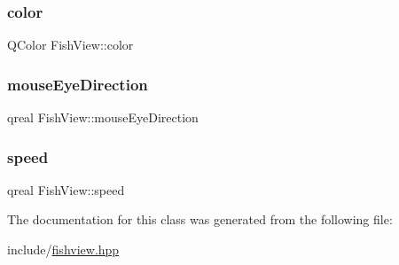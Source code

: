 \subsubsection{\texorpdfstring{color}{color}}
{\footnotesize\ttfamily Q\+Color Fish\+View\+::color\hspace{0.3cm}{\ttfamily [private]}}

\mbox{\label{classFishView_ad778ef7e064dbe30fb1963576a68d6c0_ad778ef7e064dbe30fb1963576a68d6c0}} 
\subsubsection{\texorpdfstring{mouse\+Eye\+Direction}{mouseEyeDirection}}
{\footnotesize\ttfamily qreal Fish\+View\+::mouse\+Eye\+Direction\hspace{0.3cm}{\ttfamily [private]}}

\mbox{\label{classFishView_acfc7a8baa078875d77aad279a6a80d64_acfc7a8baa078875d77aad279a6a80d64}} 
\subsubsection{\texorpdfstring{speed}{speed}}
{\footnotesize\ttfamily qreal Fish\+View\+::speed\hspace{0.3cm}{\ttfamily [private]}}



The documentation for this class was generated from the following file\+:\begin{DoxyCompactItemize}
\item 
include/\hyperlink{fishview_8hpp}{fishview.\+hpp}\end{DoxyCompactItemize}

